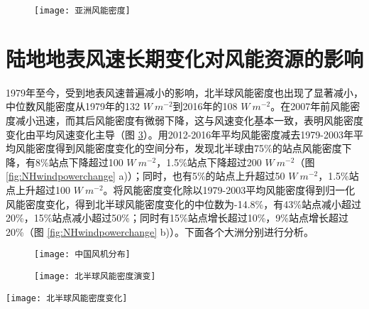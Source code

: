 \begin{figure}[!htbp]
    \centering
    \texttt{[image: 亚洲风能密度]}
    \label{fig:ASwindpower}
\end{figure}

\section{陆地地表风速长期变化对风能资源的影响}

1979年至今，受到地表风速普遍减小的影响，北半球风能密度也出现了显著减小，中位数风能密度从1979年的132 $W ~ m^{-2}$到2016年的108 $W ~ m^{-2}$。在2007年前风能密度减小迅速，而其后风能密度有微弱下降，这与风速变化基本一致，表明风能密度变化由平均风速变化主导（图 \ref{fig:NHwindpowerevolution}）。用2012-2016年平均风能密度减去1979-2003年平均风能密度得到风能密度变化的空间分布，发现北半球由75\%的站点风能密度下降，有8\%站点下降超过100 $W ~ m^{-2}$，1.5\%站点下降超过200 $W ~ m^{-2}$（图 \ref{fig:NHwindpowerchange} a)）；同时，也有5\%的站点上升超过50 $W ~ m^{-2}$，1.5\%站点上升超过100 $W ~ m^{-2}$。将风能密度变化除以1979-2003平均风能密度得到归一化风能密度变化，得到北半球风能密度变化的中位数为-14.8\%，有43\%站点减小超过20\%，15\%站点减小超过50\%；同时有15\%站点增长超过10\%，9\%站点增长超过20\%（图 \ref{fig:NHwindpowerchange} b)）。下面各个大洲分别进行分析。

\begin{figure}[!t]
    \centering
    \texttt{[image: 中国风机分布]}
    \label{fig:CHNturbinelocation}
\end{figure}

\begin{figure}[!b]
    \centering
    \texttt{[image: 北半球风能密度演变]}
    \label{fig:NHwindpowerevolution}
\end{figure}

\begin{sidewaysfigure}[!htbp]
    \centering
     \texttt{[image: 北半球风能密度变化]}
    \label{fig:NHwindpowerchange}
\end{sidewaysfigure}


